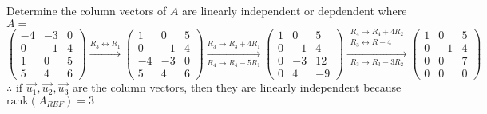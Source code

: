 \begin{example}{}{}
    Determine the column vectors of $A$ are linearly independent or depdendent where $A=$
    \[
        \begin{pmatrix}
            -4 & -3 & 0 \\
            0 & -1 & 4 \\
            1 & 0 & 5 \\
            5 & 4 & 6
        \end{pmatrix} 
        \xrightarrow{R_3 \leftrightarrow R_1}
        \begin{pmatrix}
            1 & 0 & 5 \\
            0 & -1 & 4 \\
            -4 & -3 & 0 \\
            5 & 4 & 6
        \end{pmatrix} 
        \xrightarrow[R_4 \to R_4 - 5R_1]{R_3 \to R_3 + 4R_1}
        \begin{pmatrix}
            1 & 0 & 5 \\
            0 & -1 & 4 \\
            0 & -3 & 12 \\
            0 & 4 & -9
        \end{pmatrix} 
        \xrightarrow[R_3 \to R_3 - 3R_2]{\substack{R_4 \to R_4 + 4R_2 \\ R_3 \leftrightarrow R-4}}
        \begin{pmatrix}
            1 & 0 & 5 \\
            0 & -1 & 4 \\
            0 & 0 & 7 \\
            0 & 0 & 0
        \end{pmatrix} 
    \]
    $\therefore$ if $\vec{u_1}, \vec{u_2}, \vec{u_3}$ are the column vectors, then they are linearly independent because $\text{rank}\left(A_{REF}\right) = 3$
\end{example}

